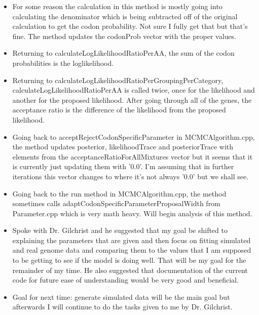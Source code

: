 \documentclass[letterpaper,index=totoc,hyperref,openany]{labbook} %
\begin{document}
\begin{itemize}
	\item For some reason the calculation in this method is mostly going into calculating the denominator which is being subtracted off of the original calculation to get the codon probability. Not sure I fully get that but that's fine. The method updates the codonProb vector with the proper values.

	\item Returning to calculateLogLikelihoodRatioPerAA, the sum of the codon probabilities is the loglikelihood.

	\item Returning to calculateLogLikelihoodRatioPerGroupingPerCategory, calculateLogLikelihoodRatioPerAA is called twice, once for the likelihood and another for the proposed likelihood. After going through all of the genes, the acceptance ratio is the difference of the likelihood from the proposed likelihood.

	\item Going back to acceptRejectCodonSpecificParameter in MCMCAlgorithm.cpp, the method updates posterior, likelihoodTrace and posteriorTrace with elements from the acceptanceRatioForAllMixtures vector but it seems that it is currently just updating them with '0.0'. I'm assuming that in further iterations this vector changes to where it's not always '0.0' but we shall see.

	\item Going back to the run method in MCMCAlgorithm.cpp, the method sometimes calls adaptCodonSpecificParameterProposalWidth from Parameter.cpp which is very math heavy. Will begin analysis of this method.

	\item Spoke with Dr. Gilchrist and he suggested that my goal be shifted to explaining the parameters that are given and then focus on fitting simulated and real genome data and comparing them to the values that I am supposed to be getting to see if the model is doing well. That will be my goal for the remainder of my time. He also suggested that documentation of the current code for future ease of understanding would be very good and beneficial.

	\item Goal for next time: generate simulated data will be the main goal but afterwards I will continue to do the tasks given to me by Dr. Gilchrist.

\end{itemize}
\end{document}
